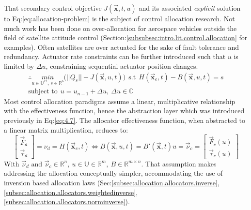 That secondary control objective $J(\vec{\mathbf{x}},t,u)$ and its associated \emph{explicit} solution to Eq:\ref{eq:allocation-problem} is the subject of control allocation research. Not much work has been done on over-allocation for aerospace vehicles outside the field of satellite attitude control (Section:\ref{subsubsec:intro.lit.control.allocation} for examples). Often satellites are over actuated for the sake of fault tolerance and redundancy\cite{FTCallocation,discreteFTC}. Actuator rate constraints can be further introduced such that $u$ is limited by $\Delta u$, constraining sequential actuator position changes.
\begin{multline}
\therefore\underset{u\in\mathbb{U}^{12},~s\in\mathbb{R}^6}{min}\big(||Q_s||+J(\vec{\mathbf{x}},u,t)\big)~~\text{s.t}~~H(\vec{\mathbf{x}}_e,t)-B(\vec{\mathbf{x}},u,t)=s\\\text{subject to}~~u=u_{n-1}+\Delta u,~\Delta u\in\mathbb{C}
\end{multline}
Most control allocation paradigms assume a linear, multiplicative relationship with the effectiveness function, hence the abstraction layer which was introduced previously in Eq:\ref{eq:4.7}. The allocator effectiveness function, when abstracted to a linear matrix multiplication, reduces to:
\begin{equation}
\begin{bmatrix}
\vec{F}_d\\
\vec{\tau}_d
\end{bmatrix}={\nu}_d=H(\vec{\mathbf{x}}_e,t)\Longleftrightarrow B(\vec{\mathbf{x}},u,t)=B'(\vec{\mathbf{x}},t)u=\vec{\nu}_c=\begin{bmatrix}
\vec{F}_c(u)\\
\vec{\tau}_c(u)
\end{bmatrix}
\end{equation}
With $\vec{\nu}_d\text{~and~}\vec{\nu}_c\in\mathbb{R}^n,~u\in\mathbb{U}\in\mathbb{R}^m,~B\in\mathbb{R}^{m\times n}$. That assumption makes addressing the allocation conceptually simpler, accommodating the use of inversion based allocation laws (Sec:\ref{subsec:allocation.allocators.inverse},\ref{subsec:allocation.allocators.weightedinverse},\ref{subsec:allocation.allocators.norminverse}).
